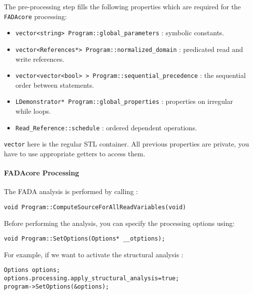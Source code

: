 The pre-processing step fills the following properties which are required for the \verb|FADAcore| processing:
\begin{itemize}
 \item \lstinline|vector<string> Program::global_parameters| : symbolic constants.
 \item \lstinline|vector<References*> Program::normalized_domain| : predicated read and write references.
 \item \lstinline|vector<vector<bool> > Program::sequential_precedence| : the sequential order between statements.
 \item \lstinline|LDemonstrator* Program::global_properties| : properties on irregular while loops.
 \item \lstinline|Read_Reference::schedule| : ordered dependent operations.
\end{itemize}

\verb|vector| here is the regular STL container. All previous properties are private, you have to use appropriate getters to access them.


\paragraph{FADAcore Processing}
The FADA analysis is performed by calling :
\begin{lstlisting}[frame=single,framerule=0pt]
void Program::ComputeSourceForAllReadVariables(void)
\end{lstlisting}
Before performing the analysis, you can specify the processing options using:

\begin{lstlisting}[frame=single,framerule=0pt]
void Program::SetOptions(Options* __otptions);
\end{lstlisting}

For example, if we want to activate the structural analysis :

\begin{lstlisting}[frame=single,framerule=0pt]
Options options;
options.processing.apply_structural_analysis=true;
program->SetOptions(&options);
\end{lstlisting}

